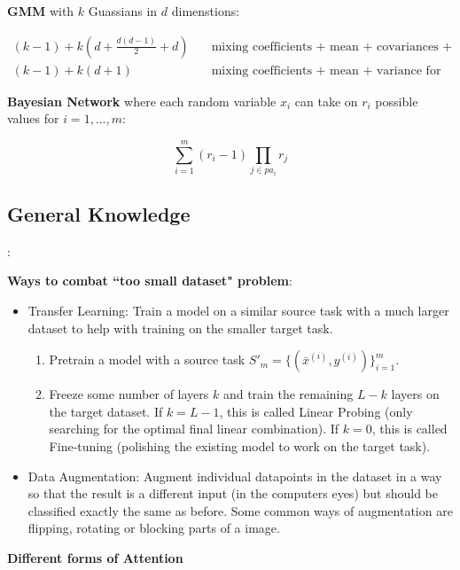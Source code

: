 \documentclass[12pt]{article}
\begin{document}
\textbf{GMM} with $k$ Guassians in $d$ dimenstions:

\[ 
	\begin{aligned}
		(k-1) + k(d + \frac {d(d-1)} 2 + d) &\quad \text{mixing coefficients + mean + covariances + variances for general}\\
		(k-1) + k(d + 1) &\quad \text{mixing coefficients + mean + variance for spherical}
	\end{aligned}
\]

\textbf{Bayesian Network} where each random variable $x_i$ can take on $r_i$ possible values for $i = 1, \dots, m$:

\[ \sum_{i = 1}^m (r_i - 1) \prod_{j \in pa_i} r_j \]

\newpage

\subsection{General Knowledge}:

\textbf{Ways to combat ``too small dataset" problem}:

\begin{itemize}
	\item Transfer Learning: Train a model on a similar source task with a much larger dataset to help with training on the smaller target task.
		\begin{enumerate}
			\item Pretrain a model with a source task $S'_m = \{ (\bar x^{(i)}, y^{(i)}) \}_{i=1}^m$.
			\item Freeze some number of layers $k$ and train the remaining $L-k$ layers on the target dataset. If $k = L-1$, this is called Linear Probing (only searching for the optimal final linear combination). If $k = 0$, this is called Fine-tuning (polishing the existing model to work on the target task).
		\end{enumerate}
	\item Data Augmentation: Augment individual datapoints in the dataset in a way so that the result is a different input (in the computers eyes) but should be classified exactly the same as before. Some common ways of augmentation are flipping, rotating or blocking parts of a image.
\end{itemize}

\textbf{Different forms of Attention}
\end{document}
